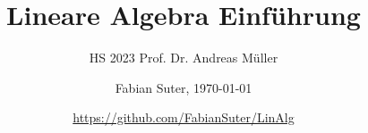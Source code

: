 \documentclass[8pt, a4paper, landscape, fleqn]{scrartcl}
\title{Lineare Algebra Einführung}
\subtitle{HS 2023 Prof. Dr. Andreas Müller}
\author{Fabian Suter, \today}
\date{{\small \url{https://github.com/FabianSuter/LinAlg}}}
\begin{document}
	\begin{multicols*}{3}
	
		\maketitle
		
		
		
		
		
		
		
		
			    
	\end{multicols*}
\end{document}
